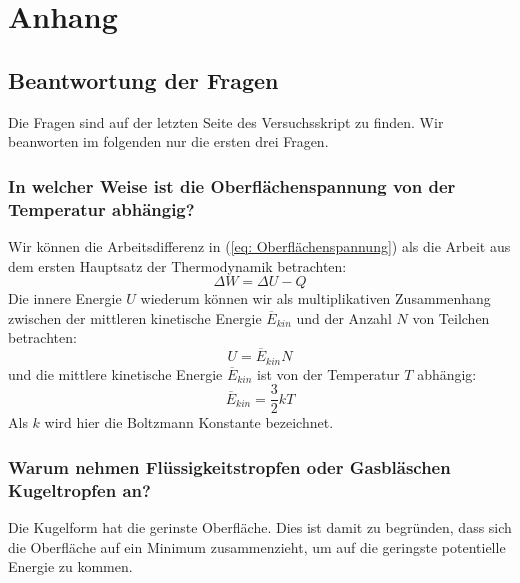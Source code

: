 \section{Anhang}
	
	
	\subsection{Beantwortung der Fragen}
	Die Fragen sind auf der letzten Seite des Versuchsskript zu finden.\smartcite{Muller.f} Wir beanworten im folgenden nur die ersten drei Fragen.
	\subsubsection[Frage 1]{In welcher Weise ist die Oberflächenspannung von der Temperatur abhängig?}\label{sect: Frage 1}
	Wir können die Arbeitsdifferenz in (\ref{eq: Oberflächenspannung}) als die Arbeit aus dem ersten Hauptsatz der Thermodynamik betrachten:\smartcite[vgl.][148]{Eichler.2016}
	\begin{equation}\label{eq: Arbeit=innere Energie-Wärme}
		\Delta W= \Delta U-Q
	\end{equation}
Die innere Energie $  U$ wiederum können wir als multiplikativen Zusammenhang zwischen der mittleren kinetische Energie $ \overline{E}_{kin} $ und der Anzahl $ N $ von Teilchen betrachten:
\begin{equation}\label{eq: innere Energie}
	U=\overline{E}_{kin} N
\end{equation}
	und die mittlere kinetische Energie $ \overline{E}_{kin} $ ist von der Temperatur $ T $ abhängig:\smartcite[vgl.][117]{Eichler.2016}
	\begin{equation}\label{eq: Ekin}
		\overline{E}_{kin}=\dfrac{3}{2}k T
	\end{equation}
Als $ k $ wird hier die Boltzmann Konstante bezeichnet.\smartcite[vgl.][117]{Eichler.2016}
	\subsubsection[Frage 2]{Warum nehmen Flüssigkeitstropfen oder Gasbläschen Kugeltropfen an?}\label{sect: Frage 2}
	Die Kugelform hat die gerinste Oberfläche.\smartcite{Unbekannt.04.07.2021} Dies ist damit zu begründen, dass sich die Oberfläche auf ein Minimum zusammenzieht, um auf die geringste potentielle Energie zu kommen.\smartcite{Muller.f}
	
	
	
